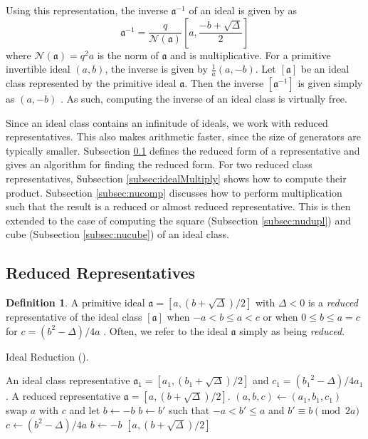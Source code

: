 \documentclass{ucalgthes1}
\theoremstyle{definition}
\newtheorem{defn}[thm]{Definition}
\newcommand{\ideal}{\mathfrak}
\newcommand{\idealclass}[1]{\left[ \ideal #1 \right]}
\newcommand{\aclass}{\idealclass a}
\begin{document}
Using this representation, the inverse $\ideal a^{-1}$ of an ideal is given by \cite[pp.14--15]{Jacobson1999} as
\begin{equation}
\label{eq:idealInverse}
	{\ideal a}^{-1} = \frac{q}{\mathcal N(\mathfrak a)} \left[a, \frac{-b+\sqrt{\Delta}}{2} \right]
\end{equation}
where $\mathcal N(\ideal a) = q^2a$ is the norm of $\ideal a$ and is multiplicative.  For a primitive invertible ideal $(a, b)$, the inverse is given by $\frac{1}{a}(a, -b)$.  Let $\aclass$ be an ideal class represented by the primitive ideal $\ideal a$.  Then the inverse $\idealclass{a^{-1}}$ is given simply as $(a, -b)$ \cite[p.20]{Ramachandran2006}.  As such, computing the inverse of an ideal class is virtually free. 

Since an ideal class contains an infinitude of ideals, we work with reduced representatives.  This also makes arithmetic faster, since the size of generators are typically smaller.  Subsection \ref{subsec:reduction} defines the reduced form of a representative and gives an algorithm for finding the reduced form.  For two reduced class representatives, Subsection \ref{subsec:idealMultiply} shows how to compute their product.  Subsection \ref{subsec:nucomp} discusses how to perform multiplication such that the result is a reduced or almost reduced representative.  This is then extended to the case of computing the square (Subsection \ref{subsec:nudupl}) and cube (Subsection \ref{subsec:nucube}) of an ideal class.  

\subsection{Reduced Representatives}
\label{subsec:reduction}

\begin{defn}
\label{defn:reducedIdeal}
A primitive ideal $\ideal a = [a, (b+\sqrt{\Delta})/2]$ with $\Delta < 0$ is a \emph{reduced} representative of the ideal class $\aclass$ when $-a < b \le a < c$ or when $0 \le b \le a = c$ for $c = (b^2 - \Delta)/4a$ \cite[p.241]{Crandall2001}.  Often, we refer to the ideal $\ideal a$ simply as being \emph{reduced}.
\end{defn}

\begin{algorithm}[htb]
\caption{Ideal Reduction (\cite[p.90]{Jacobson2006}).}
\label{alg:reduce}
\begin{algorithmic}[1]
\Require An ideal class representative $\ideal a_1 = [a_1, (b_1+\sqrt\Delta)/2]$ and $c_1 = ({b_1}^2 - \Delta)/4a_1$.
\Ensure A reduced representative $\ideal a = [a, (b+\sqrt\Delta)/2]$.
\State $(a, b, c) \gets (a_1, b_1, c_1)$
		\State swap $a$ with $c$ and let $b \gets -b$
	\EndIf
		\State $b \gets b'$ such that $-a < b' \le a$ and $b' \equiv b \pmod{2a}$
		\State $c \gets (b^2-\Delta)/4a$
	\EndIf
\EndWhile
{}
	\State $b \gets -b$
\EndIf
\State \Return $[a, (b+\sqrt\Delta)/2]$
\end{algorithmic}
\end{algorithm}
\end{document}
